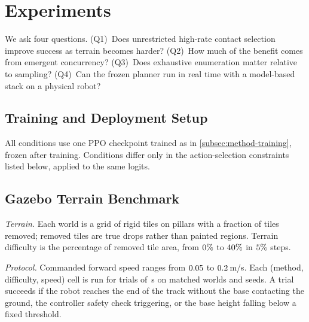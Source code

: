\section{Experiments}
\label{sec:experiments}

We ask four questions. (Q1)~Does unrestricted high-rate contact
selection improve success as terrain becomes harder? (Q2)~How much of
the benefit comes from emergent concurrency? (Q3)~Does exhaustive
enumeration matter relative to sampling? (Q4)~Can the frozen planner
run in real time with a model-based stack on a physical robot?

\subsection{Training and Deployment Setup}
\label{subsec:exp-setup}

All conditions use one PPO checkpoint trained as in
\autoref{subsec:method-training}, frozen after training. Conditions
differ only in the action-selection constraints listed below, applied
to the same logits. 

\subsection{Gazebo Terrain Benchmark}
\label{subsec:exp-gazebo}

\textit{Terrain.} Each world is a grid of rigid tiles on pillars with
a fraction of tiles removed; removed tiles are true drops rather than
painted regions. Terrain difficulty is the percentage of removed tile
area, from $0\%$ to $40\%$ in
$5\%$ steps. 

\textit{Protocol.} Commanded forward speed ranges from
$0.05$ to $0.2$\,m/s. Each (method,
difficulty, speed) cell is run for \pending{\corlSimTrialsPerCell}
trials of \pending{\corlSimEpisodeDuration}\,s on matched worlds and
seeds. A trial succeeds if the robot reaches the end of the track
without the base contacting the ground, the controller safety check
triggering, or the base height falling below a fixed threshold.

